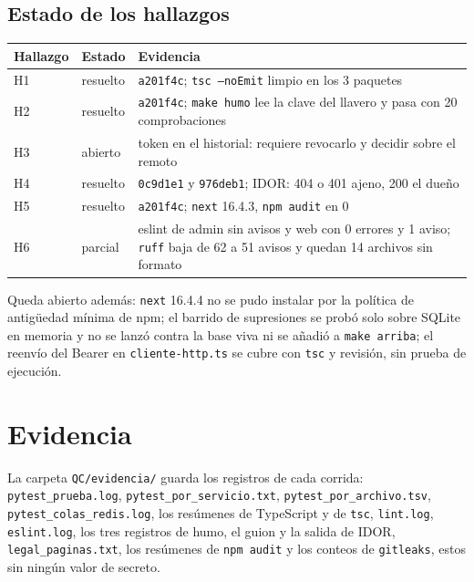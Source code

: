 \documentclass[11pt,letterpaper]{article}
\newcommand{\ruta}[1]{\texttt{\small #1}}
\begin{document}
\subsection{Estado de los hallazgos}

\begin{table}[h]
\centering\small
\begin{tabular}{llL{8.2cm}}
\toprule
Hallazgo & Estado & Evidencia \\
\midrule
H1 & resuelto & \ruta{a201f4c}; \ruta{tsc --noEmit} limpio en los 3 paquetes \\
H2 & resuelto & \ruta{a201f4c}; \ruta{make humo} lee la clave del llavero y pasa con 20 comprobaciones \\
H3 & abierto & token en el historial: requiere revocarlo y decidir sobre el remoto \\
H4 & resuelto & \ruta{0c9d1e1} y \ruta{976deb1}; IDOR: 404 o 401 ajeno, 200 el dueño \\
H5 & resuelto & \ruta{a201f4c}; \ruta{next} 16.4.3, \ruta{npm audit} en 0 \\
H6 & parcial & eslint de admin sin avisos y web con 0 errores y 1 aviso; \ruta{ruff} baja de 62 a 51 avisos y quedan 14 archivos sin formato \\
\bottomrule
\end{tabular}
\end{table}

Queda abierto además: \ruta{next} 16.4.4 no se pudo instalar por la política de antigüedad mínima de npm; el barrido de supresiones
se probó solo sobre SQLite en memoria y no se lanzó contra la base viva ni se añadió a \ruta{make arriba}; el reenvío del Bearer en
\ruta{cliente-http.ts} se cubre con \ruta{tsc} y revisión, sin prueba de ejecución.

\section{Evidencia}

La carpeta \ruta{QC/\allowbreak{}evidencia/} guarda los registros de cada corrida: \ruta{pytest\_\allowbreak{}prueba.log},
\ruta{pytest\_\allowbreak{}por\_\allowbreak{}servicio.txt}, \ruta{pytest\_\allowbreak{}por\_\allowbreak{}archivo.tsv}, \ruta{pytest\_\allowbreak{}colas\_\allowbreak{}redis.log}, los
resúmenes de TypeScript y de \ruta{tsc}, \ruta{lint.log}, \ruta{eslint.log}, los tres registros de humo, el
guion y la salida de IDOR, \ruta{legal\_\allowbreak{}paginas.txt}, los resúmenes de \ruta{npm audit} y los conteos de
\ruta{gitleaks}, estos sin ningún valor de secreto.
\end{document}
